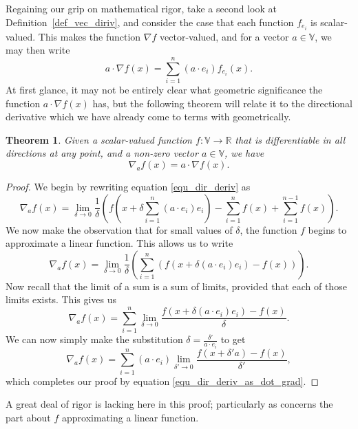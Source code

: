 \documentclass[12pt]{article}
\newcommand{\V}{\mathbb{V}}
\newcommand{\R}{\mathbb{R}}
\newtheorem{theorem}{Theorem}[section]
\begin{document}
Regaining our grip on mathematical rigor, take a second look at Definition~\ref{def_vec_diriv}, and
consider the case that each function $f_{e_i}$ is scalar-valued.  This makes the function $\nabla f$
vector-valued, and for a vector $a\in\V$, we may then write
\begin{equation}\label{equ_dir_deriv_as_dot_grad}
a\cdot \nabla f(x) = \sum_{i=1}^n (a\cdot e_i)f_{e_i}(x).
\end{equation}
At first glance, it may not be entirely clear what geometric significance the
function $a\cdot \nabla f(x)$ has, but the following theorem will relate
it to the directional derivative which we have already come to terms with geometrically.
\begin{theorem}\label{thm_dir_deriv_relate_grad}
Given a scalar-valued function $f:\V\to\R$ that is differentiable in all directions at any point,
and a non-zero vector $a\in\V$, we have
\begin{equation}
\nabla_a f(x) = a\cdot\nabla f(x).
\end{equation}
\end{theorem}
\begin{proof}
We begin by rewriting equation \eqref{equ_dir_deriv} as
\begin{equation}
\nabla_a f(x) = \lim_{\delta\to 0}\frac{1}{\delta}\left(f\left(x+\delta\sum_{i=1}^n (a\cdot e_i)e_i\right)-
\sum_{i=1}^n f(x)+\sum_{i=1}^{n-1} f(x)\right).
\end{equation}
We now make the observation that for small values of $\delta$, the function $f$ begins to
approximate a linear function.  This allows us to write
\begin{equation}
\nabla_a f(x)=\lim_{\delta\to 0}\frac{1}{\delta}\left(\sum_{i=1}^n (f(x+\delta (a\cdot e_i)e_i)-f(x))\right).
\end{equation}
Now recall that the limit of a sum is a sum of limits, provided that each of those limits exists.
This gives us
\begin{equation}
\nabla_a f(x)=\sum_{i=1}^n\lim_{\delta\to 0}\frac{f(x+\delta (a\cdot e_i)e_i)-f(x)}{\delta}.
\end{equation}
We can now simply make the substitution $\delta=\frac{\delta'}{a\cdot e_i}$ to get
\begin{equation}
\nabla_a f(x) = \sum_{i=1}^n (a\cdot e_i)\lim_{\delta'\to 0}\frac{f(x+\delta' a)-f(x)}{\delta'},
\end{equation}
which completes our proof by equation \eqref{equ_dir_deriv_as_dot_grad}.
\end{proof}
A great deal of rigor is lacking here in this proof; particularly as concerns the part about
$f$ approximating a linear function.
\end{document}
